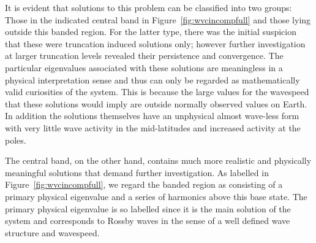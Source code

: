 It is evident that solutions to this problem can be classified into two groups: Those in the indicated central band in Figure~\ref{fig:wvcincompfull} and those lying outside this banded region. For the latter type, there was the initial suspicion that these were truncation induced solutions only; however further investigation at larger truncation levels revealed their persistence and convergence. The particular eigenvalues associated with these solutions are meaningless in a physical interpretation sense and thus can only be regarded as mathematically valid curiosities of the system. This is because the large values for the wavespeed that these solutions would imply are outside normally observed values on Earth. In addition the solutions themselves have an unphysical almost wave-less form with very little wave activity in the mid-latitudes and increased activity at the poles.
 
The central band, on the other hand, contains much more realistic and physically meaningful solutions that demand further investigation. As labelled in Figure~\ref{fig:wvcincompfull}, we regard the banded region as consisting of a primary physical eigenvalue and a series of harmonics above this base state. The primary physical eigenvalue is so labelled since it is the main solution of the system and corresponds to Rossby waves in the sense of a well defined wave structure and wavespeed.

